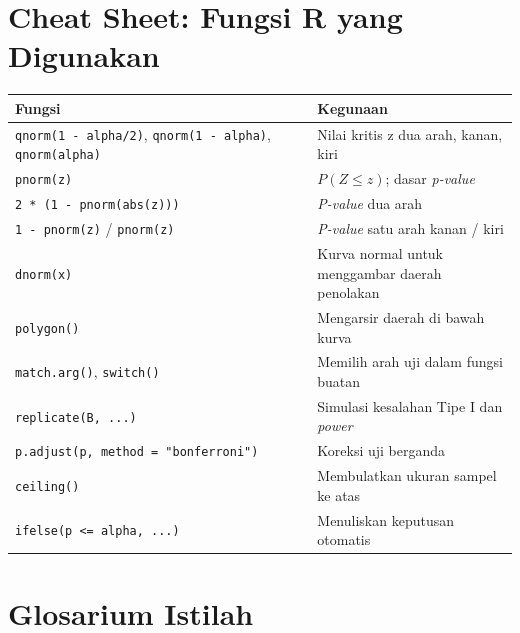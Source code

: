 \documentclass[
  indonesian,
  letterpaper,
]{book}
\newcounter{none} %
\begin{document}
\section{Cheat Sheet: Fungsi R yang
Digunakan}\label{cheat-sheet-fungsi-r-yang-digunakan-1}

{\def\LTcaptype{none} %
\begin{longtable}[]{@{}
  >{\raggedright\arraybackslash}p{}
  >{\raggedright\arraybackslash}p{}@{}}
\toprule\noalign{}
\begin{minipage}[b]{\linewidth}\raggedright
Fungsi
\end{minipage} & \begin{minipage}[b]{\linewidth}\raggedright
Kegunaan
\end{minipage} \\
\midrule\noalign{}
\endhead
\bottomrule\noalign{}
\endlastfoot
\texttt{qnorm(1\ -\ alpha/2)}, \texttt{qnorm(1\ -\ alpha)},
\texttt{qnorm(alpha)} & Nilai kritis z dua arah, kanan, kiri \\
\texttt{pnorm(z)} & \(P(Z \le z)\); dasar \emph{p-value} \\
\texttt{2\ *\ (1\ -\ pnorm(abs(z)))} & \emph{P-value} dua arah \\
\texttt{1\ -\ pnorm(z)} / \texttt{pnorm(z)} & \emph{P-value} satu arah
kanan / kiri \\
\texttt{dnorm(x)} & Kurva normal untuk menggambar daerah penolakan \\
\texttt{polygon()} & Mengarsir daerah di bawah kurva \\
\texttt{match.arg()}, \texttt{switch()} & Memilih arah uji dalam fungsi
buatan \\
\texttt{replicate(B,\ ...)} & Simulasi kesalahan Tipe I dan
\emph{power} \\
\texttt{p.adjust(p,\ method\ =\ "bonferroni")} & Koreksi uji berganda \\
\texttt{ceiling()} & Membulatkan ukuran sampel ke atas \\
\texttt{ifelse(p\ \textless{}=\ alpha,\ ...)} & Menuliskan keputusan
otomatis \\
\end{longtable}
}

\section{Glosarium Istilah}\label{glosarium-istilah-1}
\end{document}
